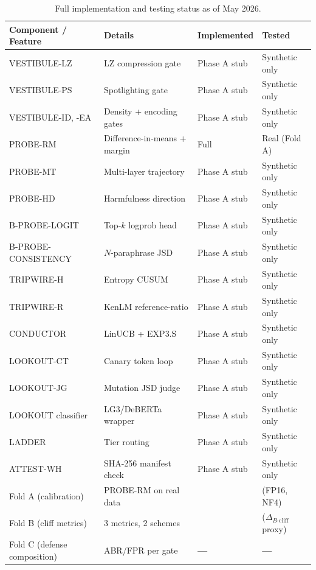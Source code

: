 \documentclass[11pt,a4paper]{article}
\newcommand{\bcliff}{\Delta_{B\text{-cliff}}}
\newcommand{\YES}{\textcolor{green!50!black}{\textbf{\checkmark}}}
\newcommand{\NO}{\textcolor{red!60!black}{\textbf{---}}}
\begin{document}
\begin{table}[H]
  \centering
  \small
  \caption{Full implementation and testing status as of May 2026.}
  \label{tab:status}
  \begin{tabularx}{\textwidth}{@{}lXll@{}}
    \toprule
    Component / Feature & Details & Implemented & Tested \\
    \midrule
    VESTIBULE-LZ & LZ compression gate & Phase A stub & Synthetic only \\
    VESTIBULE-PS & Spotlighting gate & Phase A stub & Synthetic only \\
    VESTIBULE-ID, -EA & Density + encoding gates & Phase A stub & Synthetic only \\
    \midrule
    PROBE-RM & Difference-in-means + margin & \YES{} Full & \YES{} Real (Fold A) \\
    PROBE-MT & Multi-layer trajectory & Phase A stub & Synthetic only \\
    PROBE-HD & Harmfulness direction & Phase A stub & Synthetic only \\
    \midrule
    B-PROBE-LOGIT & Top-$k$ logprob head & Phase A stub & Synthetic only \\
    B-PROBE-CONSISTENCY & $N$-paraphrase JSD & Phase A stub & Synthetic only \\
    \midrule
    TRIPWIRE-H & Entropy CUSUM & Phase A stub & Synthetic only \\
    TRIPWIRE-R & KenLM reference-ratio & Phase A stub & Synthetic only \\
    \midrule
    CONDUCTOR & LinUCB + EXP3.S & Phase A stub & Synthetic only \\
    \midrule
    LOOKOUT-CT & Canary token loop & Phase A stub & Synthetic only \\
    LOOKOUT-JG & Mutation JSD judge & Phase A stub & Synthetic only \\
    LOOKOUT classifier & LG3/DeBERTa wrapper & Phase A stub & Synthetic only \\
    \midrule
    LADDER & Tier routing & Phase A stub & Synthetic only \\
    \midrule
    ATTEST-WH & SHA-256 manifest check & Phase A stub & Synthetic only \\
    \midrule
    Fold A (calibration) & PROBE-RM on real data & \YES{} & \YES{} (FP16, NF4) \\
    Fold B (cliff metrics) & 3 metrics, 2 schemes & \YES{} & \YES{} ($\bcliff$ proxy) \\
    Fold C (defense composition) & ABR/FPR per gate & \NO{} & \NO{} \\

\end{tabularx}
\end{table}
\end{document}
